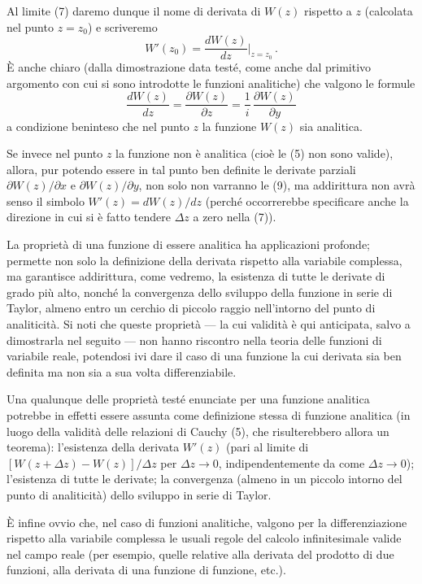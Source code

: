 \documentclass[11pt, a4paper]{book}
\numberwithin{equation}{section}
\begin{document}
Al limite (7) daremo dunque il nome di derivata di $W(z)$ rispetto a $z$ (calcolata nel punto $z = z_0$) e scriveremo
\begin{equation}
W'(z_0) = \frac{dW(z)}{dz}\bigg|_{z=z_0}\,. \tag{8}
\end{equation}
È anche chiaro (dalla dimostrazione data testé, come anche dal primitivo argomento con cui si sono introdotte le funzioni analitiche) che valgono le formule
\begin{equation}
\frac{dW(z)}{dz} = \frac{\partial W(z)}{\partial z} = \frac{1}{i}\,\frac{\partial W(z)}{\partial y} \tag{9}
\end{equation}
a condizione beninteso che nel punto $z$ la funzione $W(z)$ sia analitica.

Se invece nel punto $z$ la funzione non è analitica (cioè le (5) non sono valide), allora, pur potendo essere in tal punto ben definite le derivate parziali $\partial W(z)/\partial x$ e $\partial W(z)/\partial y$, non solo non varranno le (9), ma addirittura non avrà senso il simbolo $W'(z) = dW(z)/dz$ (perché occorrerebbe specificare anche la direzione in cui si è fatto tendere $\Delta z$ a zero nella (7)).

La proprietà di una funzione di essere analitica ha applicazioni profonde; permette non solo la definizione della derivata rispetto alla variabile complessa, ma garantisce addirittura, come vedremo, la esistenza di tutte le derivate di grado più alto, nonché la convergenza dello sviluppo della funzione in serie di Taylor, almeno entro un cerchio di piccolo raggio nell'intorno del punto di analiticità. Si noti che queste proprietà --- la cui validità è qui anticipata, salvo a dimostrarla nel seguito --- non hanno riscontro nella teoria delle funzioni di variabile reale, potendosi ivi dare il caso di una funzione la cui derivata sia ben definita ma non sia a sua volta differenziabile.

Una qualunque delle proprietà testé enunciate per una funzione analitica potrebbe in effetti essere assunta come definizione stessa di funzione analitica (in luogo della validità delle relazioni di Cauchy (5), che risulterebbero allora un teorema): l'esistenza della derivata $W'(z)$ (pari al limite di $[W(z+\Delta z) - W(z)]/\Delta z$ per $\Delta z \to 0$, indipendentemente da come $\Delta z \to 0$); l'esistenza di tutte le derivate; la convergenza (almeno in un piccolo intorno del punto di analiticità) dello sviluppo in serie di Taylor.

È infine ovvio che, nel caso di funzioni analitiche, valgono per la differenziazione rispetto alla variabile complessa le usuali regole del calcolo infinitesimale valide nel campo reale (per esempio, quelle relative alla derivata del prodotto di due funzioni, alla derivata di una funzione di funzione, etc.).
\end{document}
